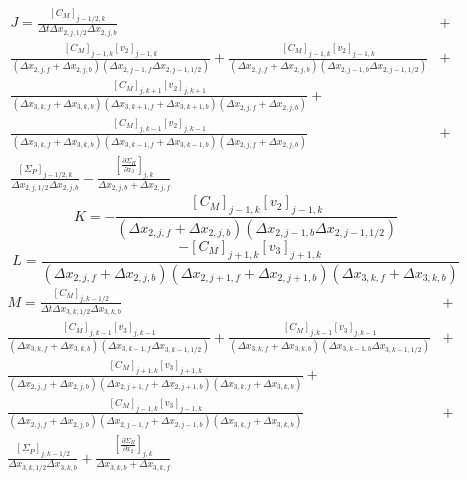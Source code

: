 \documentclass[11pt,letterpaper]{article}
\begin{document}
\begin{eqnarray}
J = \frac{[C_M]_{j-1/2,k}}{\Delta t \Delta x_{2,j,1/2} \Delta x_{2,j,b}} &+& \nonumber \\
\frac{[C_M]_{j-1,k} [v_{2}]_{j-1,k}}{\left( \Delta x_{2,j,f} + \Delta x_{2,j,b} \right) \left( \Delta x_{2,j-1,f} \Delta x_{2,j-1,1/2} \right)} + \frac{[C_M]_{j-1,k} [v_{2}]_{j-1,k}}{\left( \Delta x_{2,j,f} + \Delta x_{2,j,b} \right) \left( \Delta x_{2,j-1,b} \Delta x_{2,j-1,1/2} \right)} &+& \nonumber \\
\frac{[C_M]_{j,k+1} [v_2]_{j,k+1} }{ \left( \Delta x_{3,k,f}+\Delta x_{3,k,b} \right) \left( \Delta x_{3,k+1,f}+\Delta x_{3,k+1,b} \right) \left( \Delta x_{2,j,f}+\Delta x_{2,j,b} \right) } + &~& \nonumber \\
\frac{[C_M]_{j,k-1} [v_2]_{j,k-1} }{ \left( \Delta x_{3,k,f}+\Delta x_{3,k,b} \right) \left( \Delta x_{3,k-1,f}+\Delta x_{3,k-1,b} \right) \left( \Delta x_{2,j,f}+\Delta x_{2,j,b} \right) } &+& \nonumber \\
\frac{ \left[ \Sigma_P \right]_{j-1/2,k} }{\Delta x_{2,j,1/2} \Delta x_{2,j,b}} - \frac{ \left[ \frac{\partial \Sigma_H}{\partial x_3} \right]_{j,k}}{\Delta x_{2,j,b} + \Delta x_{2,j,f}}
\end{eqnarray}
\begin{equation}
K = - \frac{[C_M]_{j-1,k} [v_{2}]_{j-1,k}}{\left( \Delta x_{2,j,f} + \Delta x_{2,j,b} \right) \left( \Delta x_{2,j-1,b} \Delta x_{2,j-1,1/2} \right)}
\end{equation}
\begin{equation}
L = \frac{-[C_M]_{j+1,k} [v_3]_{j+1,k} }{ \left( \Delta x_{2,j,f}+\Delta x_{2,j,b} \right) \left( \Delta x_{2,j+1,f}+\Delta x_{2,j+1,b} \right) \left( \Delta x_{3,k,f}+\Delta x_{3,k,b} \right) }
\end{equation}
\begin{eqnarray}
M = \frac{[C_M]_{j,k-1/2}}{\Delta t \Delta x_{3,k,1/2} \Delta x_{3,k,b}} &+& \nonumber \\
\frac{[C_M]_{j,k-1} [v_{3}]_{j,k-1}}{\left( \Delta x_{3,k,f} + \Delta x_{3,k,b} \right) \left( \Delta x_{3,k-1,f} \Delta x_{3,k-1,1/2} \right)} + \frac{[C_M]_{j,k-1} [v_{3}]_{j,k-1}}{\left( \Delta x_{3,k,f} + \Delta x_{3,k,b} \right) \left( \Delta x_{3,k-1,b} \Delta x_{3,k-1,1/2} \right)} &+& \nonumber \\
\frac{[C_M]_{j+1,k} [v_3]_{j+1,k} }{ \left( \Delta x_{2,j,f}+\Delta x_{2,j,b} \right) \left( \Delta x_{2,j+1,f}+\Delta x_{2,j+1,b} \right) \left( \Delta x_{3,k,f}+\Delta x_{3,k,b} \right) } + &~& \nonumber \\
 \frac{[C_M]_{j-1,k} [v_3]_{j-1,k} }{ \left( \Delta x_{2,j,f}+\Delta x_{2,j,b} \right) \left( \Delta x_{2,j-1,f}+\Delta x_{2,j-1,b} \right) \left( \Delta x_{3,k,f}+\Delta x_{3,k,b} \right) } &+& \nonumber \\
 \frac{ \left[ \Sigma_P \right]_{j,k-1/2}}{\Delta x_{3,k,1/2} \Delta x_{3,k,b}} + \frac{ \left[ \frac{\partial \Sigma_H}{\partial x_2} \right]_{j,k}}{\Delta x_{3,k,b} + \Delta x_{3,k,f}}
\end{eqnarray}
\end{document}

